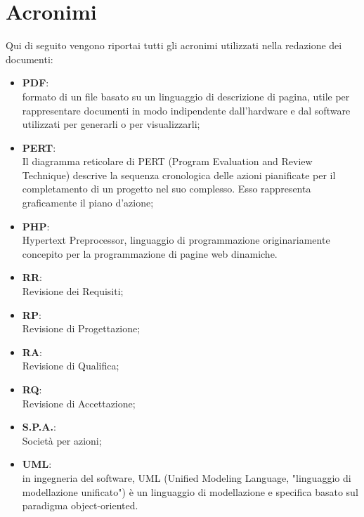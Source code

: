 \section{Acronimi}
Qui di seguito vengono riportai tutti gli acronimi utilizzati nella redazione dei documenti:
\begin{itemize}
\item \textbf{PDF}:\\ formato di un file basato su un linguaggio di descrizione di pagina, utile per rappresentare documenti in modo indipendente dall'hardware e dal software utilizzati per generarli o per visualizzarli;
\item \textbf{PERT}:\\ Il diagramma reticolare di PERT (Program Evaluation and Review Technique) descrive la sequenza cronologica delle azioni pianificate per il completamento di un progetto nel suo complesso. Esso rappresenta graficamente il piano d’azione;
\item \textbf{PHP}:\\ Hypertext Preprocessor, linguaggio di programmazione originariamente concepito per la programmazione di pagine web dinamiche.
\item \textbf{RR}:\\ Revisione dei Requisiti;
\item \textbf{RP}:\\ Revisione di Progettazione;
\item \textbf{RA}:\\ Revisione di Qualifica;
\item \textbf{RQ}:\\ Revisione di Accettazione;
\item \textbf{S.P.A.}:\\ Società per azioni;
\item \textbf{UML}:\\ in ingegneria del software, UML (Unified Modeling Language, "linguaggio di modellazione unificato") è un linguaggio di modellazione e specifica basato sul paradigma object-oriented.
\end{itemize}